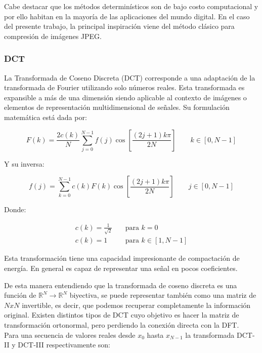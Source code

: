         Cabe destacar que los métodos determinísticos son de bajo costo computacional y por ello habitan en la mayoría de las aplicaciones del mundo digital. En el caso del presente trabajo, la principal inspiración viene del método clásico para compresión de imágenes JPEG.

        \subsubsection{DCT}
    La Transformada de Coseno Discreta (DCT) corresponde a una adaptación de la transformada de Fourier utilizando solo números reales. Esta transformada es expansible a más de una dimensión siendo aplicable al contexto de imágenes o elementos de representación multidimensional de señales. Su formulación matemática está dada por:

    \begin{equation*}
        F(k) = \frac{2c(k)}{N}\sum_{j=0}^{N-1}f(j)\cos{\left[\frac{(2j+1)k\pi}{2N}\right]} \quad\quad k \in [0,N-1]
    \end{equation*}


    Y su inversa:

    \begin{equation*}
        f(j) = \sum_{k=0}^{N-1}c(k)F(k)\cos{\left[\frac{(2j+1)k\pi}{2N}\right]} \quad\quad j \in [0,N-1]
    \end{equation*}

    Donde:

    \begin{align*}
        c(k) = \frac{1}{\sqrt{2}} &\quad \text{para } k = 0 \\
        c(k) = 1 &\quad \text{para } k \in [1,N-1]
    \end{align*}

    Esta transformación tiene una capacidad impresionante de compactación de energía. En general es capaz de representar una señal en pocos coeficientes.


    De esta manera entendiendo que la transformada de coseno discreta es una función de $\mathbb{R}^N \rightarrow \mathbb{R}^N$ biyectiva, se puede representar también como una matriz de $NxN$ invertible, es decir, que podemos recuperar completamente la información original. Existen distintos tipos de DCT cuyo objetivo es hacer la matriz de transformación ortonormal, pero perdiendo la conexión directa con la DFT.\\

    Para una secuencia de valores reales desde $x_0$ hasta $x_{N-1}$ la transformada DCT-II y DCT-III respectivamente son:

